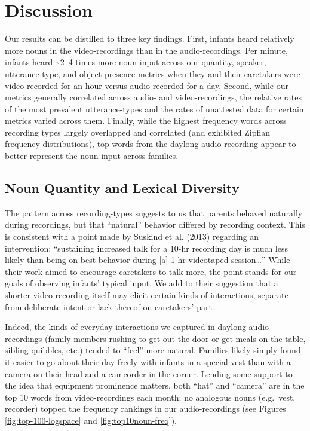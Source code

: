 \documentclass[man]{apa6}
\theoremstyle{definition}
\theoremstyle{definition}
\theoremstyle{definition}
\theoremstyle{remark}
\begin{document}
\section{Discussion}\label{discussion}

Our results can be distilled to three key findings. First, infants heard
relatively more nouns in the video-recordings than in the
audio-recordings. Per minute, infants heard \textasciitilde{}2--4 times
more noun input across our quantity, speaker, utterance-type, and
object-presence metrics when they and their caretakers were
video-recorded for an hour versus audio-recorded for a day. Second,
while our metrics generally correlated across audio- and
video-recordings, the relative rates of the most prevalent
utterance-types and the rates of unattested data for certain metrics
varied across them. Finally, while the highest frequency words across
recording types largely overlapped and correlated (and exhibited Zipfian
frequency distributions), top words from the daylong audio-recording
appear to better represent the noun input across families.

\subsection{Noun Quantity and Lexical
Diversity}\label{noun-quantity-and-lexical-diversity}

The pattern across recording-types suggests to us that parents behaved
naturally during recordings, but that \enquote{natural} behavior
differed by recording context. This is consistent with a point made by
Suskind et al. (2013) regarding an intervention: \enquote{sustaining
increased talk for a 10-hr recording day is much less likely than being
on best behavior during {[}a{]} 1-hr videotaped session\ldots{}} While
their work aimed to encourage caretakers to talk more, the point stands
for our goals of observing infants' typical input. We add to their
suggestion that a shorter video-recording itself may elicit certain
kinds of interactions, separate from deliberate intent or lack thereof
on caretakers' part.

Indeed, the kinds of everyday interactions we captured in daylong
audio-recordings (family members rushing to get out the door or get
meals on the table, sibling quibbles, etc.) tended to \enquote{feel}
more natural. Families likely simply found it easier to go about their
day freely with infants in a special vest than with a camera on their
head and a camcorder in the corner. Lending some support to the idea
that equipment prominence matters, both \enquote{hat} and
\enquote{camera} are in the top 10 words from video-recordings each
month; no analogous nouns (e.g.~vest, recorder) topped the frequency
rankings in our audio-recordings (see Figures \ref{fig:top-100-logspace}
and \ref{fig:top10noun-freq}).
\end{document}
